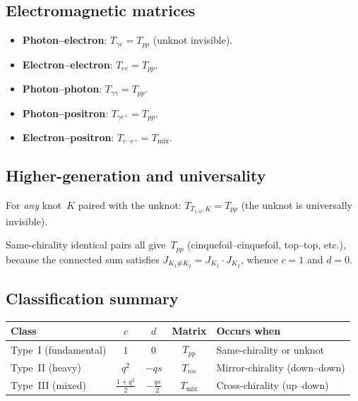 \documentclass[12pt,a4paper]{article}
\begin{document}
\subsection{Electromagnetic matrices}

\begin{itemize}
  \item \textbf{Photon--electron}: $T_{\gamma e} = T_{pp}$
    \quad (unknot invisible).
  \item \textbf{Electron--electron}: $T_{ee} = T_{pp}$.
  \item \textbf{Photon--photon}: $T_{\gamma\gamma} = T_{pp}$.
  \item \textbf{Photon--positron}: $T_{\gamma e^+} = T_{pp}$.
  \item \textbf{Electron--positron}: $T_{e^-e^+} = T_{\mathrm{mix}}$.
\end{itemize}

\subsection{Higher-generation and universality}

For \emph{any} knot~$K$ paired with the unknot:
$T_{T_{1,0},K} = T_{pp}$ (the unknot is universally invisible).

\medskip

Same-chirality identical pairs all give~$T_{pp}$
(cinquefoil--cinquefoil, top--top, etc.), because the connected sum
satisfies $J_{K_1 \# K_2} = J_{K_1} \cdot J_{K_2}$, whence $c = 1$
and $d = 0$.

\subsection{Classification summary}

\begin{tabular}{@{} l c c c l @{}}
\toprule
\textbf{Class} & $c$ & $d$ & \textbf{Matrix} & \textbf{Occurs when} \\
\midrule
Type~I (fundamental)
  & $1$ & $0$ & $T_{pp}$ & Same-chirality or unknot \\[3pt]
Type~II (heavy)
  & $q^2$ & $-qs$ & $T_{nn}$ & Mirror-chirality (down--down) \\[3pt]
Type~III (mixed)
  & $\frac{1+q^2}{2}$ & $-\frac{qs}{2}$ & $T_{\mathrm{mix}}$ & Cross-chirality (up--down) \\[3pt]
\bottomrule
\end{tabular}

\bigskip
\end{document}

